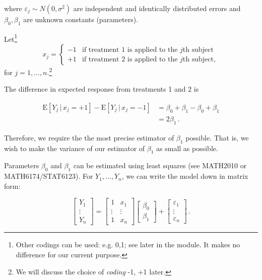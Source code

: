 \documentclass[
]{book}
\theoremstyle{definition}
\theoremstyle{definition}
\theoremstyle{definition}
\theoremstyle{definition}
\theoremstyle{remark}
\begin{document}
where \(\varepsilon_j\sim N(0,\sigma^{2})\) are independent and identically distributed errors and \(\beta_{0}, \beta_{1}\) are unknown constants (parameters).

Let\footnote{Other codings can be used: e.g. 0,1; see later in the module. It makes no difference for our current purpose.}
\begin{equation}
x_{j}=\left\{\begin{array}{ll}
-1&\textrm{if treatment 1 is applied to the $j$th subject}\\
+1&\textrm{if treatment 2 is applied to the $j$th subject}\nonumber ,
\end{array}
\right.
\end{equation}
for \(j=1,\dots,n\).\footnote{We will discuss the choice of \emph{coding} -1, +1 later.}

The difference in expected response from treatments 1 and 2 is

\begin{equation}
\begin{split}
\textrm{E}[Y_j\, |\, x_j = +1] - \textrm{E}[Y_j\, |\, x_j = -1] & = \beta_{0}+\beta_{1}-\beta_{0}+\beta_{1} \\
& = 2\beta_{1}\,.
\end{split}
\label{eq:ex-ex-response}
\end{equation}

Therefore, we require the the most precise estimator of \(\beta_{1}\) possible. That is, we wish to make the variance of our estimator of \(\beta_1\) as small as possible.

Parameters \(\beta_{0}\) and \(\beta_{1}\) can be estimated using least squares (see MATH2010 or MATH6174/STAT6123). For \(Y_1,\dots,Y_n\), we can write the model down in matrix form:

\begin{equation*}
\left[ \begin{array}{c}
Y_1\\
\vdots\\
Y_n\end{array}\right]
=\left[ \begin{array}{cc}
1&x_{1}\\
\vdots&\vdots\\
1&x_{n}\end{array}\right]
\left[ \begin{array}{c}
\beta_{0}\\
\beta_{1}\end{array}\right]
+\left[ \begin{array}{c}
\varepsilon_{1}\\
\vdots\\
\varepsilon_{n}\end{array}\right]\,.
\end{equation*}
\end{document}
